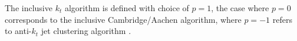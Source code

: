 The inclusive $k_t$ algorithm is defined with choice of $p = 1$, the case where $p = 0$  corresponds to the inclusive Cambridge/Aachen algorithm, where $p = -1$ refers to anti-$k_t$ jet clustering algorithm \citep{Cacciari:2008gp}.


%
%
%
%
%
%
%
%
%
%
%
%
%
%
%
%
%
%
%
%
%
%
%
%
%

